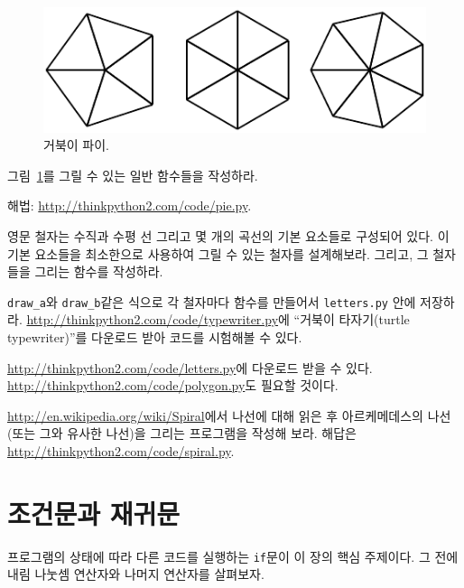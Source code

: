 \documentclass[10pt]{book}
\begin{document}
\begin{figure}
\centerline
{\includegraphics[scale=0.8]{figs/pies.pdf}}
\caption{거북이 파이.}
\label{fig.pies}
\end{figure}


\begin{exercise}

그림~\ref{fig.pies}를 그릴 수 있는 일반 함수들을 작성하라.


해법: \url{http://thinkpython2.com/code/pie.py}.

\end{exercise}

\begin{exercise}

영문 철자는 수직과 수평 선 그리고 몇 개의 곡선의 기본 요소들로 구성되어
있다. 이 기본 요소들을 최소한으로 사용하여 그릴 수 있는 철자를
설계해보라.  그리고, 그 철자들을 그리는 함수를 작성하라.

\verb"draw_a"와 \verb"draw_b"같은 식으로 각 철자마다 함수를 만들어서
{\tt letters.py} 안에 저장하라.
\url{http://thinkpython2.com/code/typewriter.py}에 ``거북이
타자기(turtle typewriter)''를 다운로드 받아 코드를 시험해볼 수 있다.

\url{http://thinkpython2.com/code/letters.py}에 다운로드 받을 수
있다. \url{http://thinkpython2.com/code/polygon.py}도 필요할 것이다.


\end{exercise}

\begin{exercise}

  \url{http://en.wikipedia.org/wiki/Spiral}에서 나선에 대해 읽은 후
  아르케메데스의 나선(또는 그와 유사한 나선)을 그리는 프로그램을 작성해
  보라.  해답은 \url{http://thinkpython2.com/code/spiral.py}.

\end{exercise}


\chapter{조건문과 재귀문}
프로그램의 상태에 따라 다른 코드를 실행하는 {\tt if}문이 이 장의 핵심
주제이다.  그 전에 내림 나눗셈 연산자와 나머지 연산자를 살펴보자.
\end{document}

